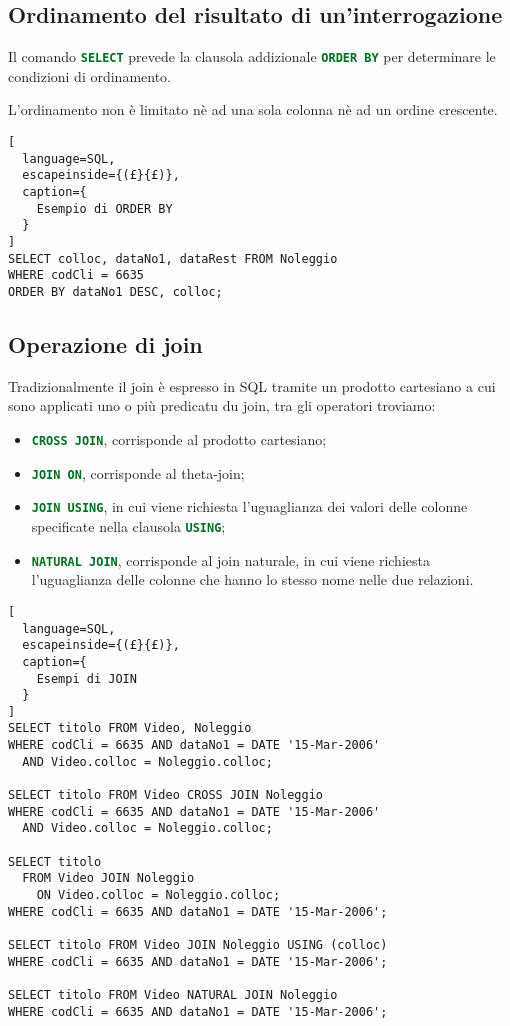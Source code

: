 \subsection{Ordinamento del risultato di un'interrogazione}%
\label{sub:Ordinamento del risultato di un'interrogazione}
Il comando \lstinline[language=SQL]{SELECT} prevede la clausola addizionale
\lstinline[language=SQL]{ORDER BY} per determinare le condizioni di ordinamento.

L'ordinamento non è limitato nè ad una sola colonna nè ad un ordine crescente.
\begin{lstlisting}[
  language=SQL,
  escapeinside={(£}{£)},
  caption={
    Esempio di ORDER BY
  }
]
SELECT colloc, dataNo1, dataRest FROM Noleggio
WHERE codCli = 6635
ORDER BY dataNo1 DESC, colloc;
\end{lstlisting}

\subsection{Operazione di join}%
\label{sub:Operazione di join}
Tradizionalmente il join è espresso in SQL tramite un prodotto cartesiano a cui
sono applicati uno o più predicatu du join, tra gli operatori troviamo:
\begin{itemize}
  \item \lstinline[language=SQL]{CROSS JOIN}, corrisponde al prodotto
    cartesiano;
  \item \lstinline[language=SQL]{JOIN ON}, corrisponde al theta-join;
  \item \lstinline[language=SQL]{JOIN USING}, in cui viene richiesta
    l'uguaglianza dei valori delle colonne specificate nella clausola
    \lstinline[language=SQL]{USING};
  \item \lstinline[language=SQL]{NATURAL JOIN}, corrisponde al join naturale, in
    cui viene richiesta l'uguaglianza delle colonne che hanno lo stesso nome
    nelle due relazioni.
\end{itemize}
\begin{lstlisting}[
  language=SQL,
  escapeinside={(£}{£)},
  caption={
    Esempi di JOIN
  }
]
SELECT titolo FROM Video, Noleggio
WHERE codCli = 6635 AND dataNo1 = DATE '15-Mar-2006'
  AND Video.colloc = Noleggio.colloc;

SELECT titolo FROM Video CROSS JOIN Noleggio
WHERE codCli = 6635 AND dataNo1 = DATE '15-Mar-2006'
  AND Video.colloc = Noleggio.colloc;

SELECT titolo
  FROM Video JOIN Noleggio
    ON Video.colloc = Noleggio.colloc;
WHERE codCli = 6635 AND dataNo1 = DATE '15-Mar-2006';

SELECT titolo FROM Video JOIN Noleggio USING (colloc)
WHERE codCli = 6635 AND dataNo1 = DATE '15-Mar-2006';

SELECT titolo FROM Video NATURAL JOIN Noleggio
WHERE codCli = 6635 AND dataNo1 = DATE '15-Mar-2006';
\end{lstlisting}

